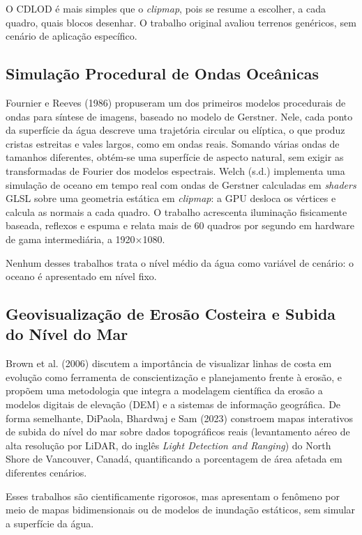 \documentclass[conference]{IEEEtran}
\begin{document}
O CDLOD é mais simples que o \emph{clipmap}, pois se resume a escolher, a
cada quadro, quais blocos desenhar. O trabalho original avaliou terrenos
genéricos, sem cenário de aplicação específico.

\subsection{Simulação Procedural de Ondas Oceânicas}
\label{sub:ondas-rel}

Fournier e Reeves (1986) propuseram um dos primeiros modelos procedurais de
ondas para síntese de imagens, baseado no modelo de Gerstner. Nele, cada
ponto da superfície da água descreve uma trajetória circular ou elíptica, o
que produz cristas estreitas e vales largos, como em ondas reais. Somando
várias ondas de tamanhos diferentes, obtém-se uma superfície de aspecto
natural, sem exigir as transformadas de Fourier dos modelos espectrais. Welch (s.d.)
implementa uma simulação de oceano em tempo real com ondas de Gerstner
calculadas em \emph{shaders} GLSL sobre uma geometria estática em
\emph{clipmap}: a GPU desloca os vértices e calcula as normais a cada quadro.
O trabalho acrescenta iluminação fisicamente baseada, reflexos e espuma e
relata mais de 60 quadros por segundo em hardware de gama intermediária, a
1920$\times$1080.

Nenhum desses trabalhos trata o nível médio da água como variável de
cenário: o oceano é apresentado em nível fixo.

\subsection{Geovisualização de Erosão Costeira e Subida do Nível do Mar}
\label{sub:geovis}

Brown et al. (2006) discutem a importância de visualizar linhas de costa em
evolução como ferramenta de conscientização e planejamento frente à erosão,
e propõem uma metodologia que integra a modelagem científica da erosão a
modelos digitais de elevação (DEM) e a sistemas de informação geográfica.
De forma semelhante, DiPaola, Bhardwaj e Sam (2023) constroem mapas
interativos de subida do nível do mar sobre dados topográficos reais
(levantamento aéreo de alta resolução por LiDAR, do inglês \emph{Light
Detection and Ranging}) do North Shore de Vancouver, Canadá,
quantificando a porcentagem de área afetada em diferentes cenários.

Esses trabalhos são cientificamente rigorosos, mas apresentam o fenômeno por
meio de mapas bidimensionais ou de modelos de inundação estáticos, sem
simular a superfície da água.
\end{document}
